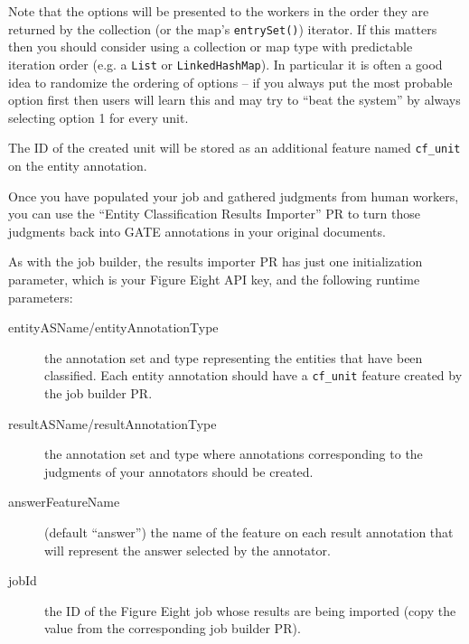 \begin{description}
\end{description}

Note that the options will be presented to the workers in the order they are
returned by the collection (or the map's \verb!entrySet()!) iterator.
If this matters then you should consider using a collection or map type with
predictable iteration order (e.g. a \verb!List! or \verb!LinkedHashMap!).  In
particular it is often a good idea to randomize the ordering of options -- if
you always put the most probable option first then users will learn this and
may try to ``beat the system'' by always selecting option 1 for every unit.

The ID of the created unit will be stored as an additional feature named
\verb!cf_unit! on the entity annotation.


Once you have populated your job and gathered judgments from human workers, you
can use the ``Entity Classification Results Importer'' PR to turn those
judgments back into GATE annotations in your original documents.

As with the job builder, the results importer PR has just one initialization
parameter, which is your Figure Eight API key, and the following runtime
parameters:
\begin{description}
\item[entityASName/entityAnnotationType] the annotation set and type
  representing the entities that have been classified.  Each entity annotation
  should have a \verb!cf_unit! feature created by the job builder PR.
\item[resultASName/resultAnnotationType] the annotation set and type where
  annotations corresponding to the judgments of your annotators should be
  created.
\item[answerFeatureName] (default ``answer'') the name of the feature on each
  result annotation that will represent the answer selected by the annotator.
\item[jobId] the ID of the Figure Eight job whose results are being imported
  (copy the value from the corresponding job builder PR).
\end{description}

